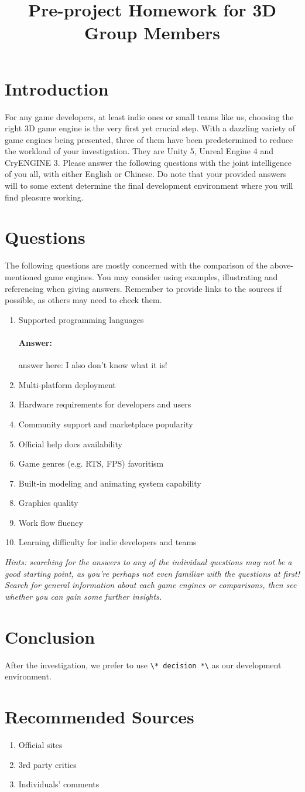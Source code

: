 \documentclass{ctexart}
\title{Pre-project Homework for 3D Group Members}
\begin{document}
	\maketitle
	\section{Introduction}
	For any game developers, at least indie ones or small teams like us, choosing the right 3D game engine is the very first yet crucial step. With a dazzling variety of game engines being presented, three of them have been predetermined to reduce the workload of your investigation. They are Unity 5, Unreal Engine 4 and CryENGINE 3. Please answer the following questions with the joint intelligence of you all, with either English or Chinese. Do note that your provided answers will to some extent determine the final development environment where you will find pleasure working.
	\section{Questions}
	The following questions are mostly concerned with the comparison of the above-mentioned game engines. You may consider using examples, illustrating and referencing when giving answers. Remember to provide links to the sources if possible, as others may need to check them.
	\begin{enumerate}
		\item Supported programming languages
		\paragraph{Answer:}
		answer here:
		I also don't know what it is!
		\item Multi-platform deployment
		\item Hardware requirements for developers and users
		\item Community support and marketplace popularity
		\item Official help docs availability
		\item Game genres (e.g. RTS, FPS) favoritism
		\item Built-in modeling and animating system capability
		\item Graphics quality
		\item Work flow fluency
		\item Learning difficulty for indie developers and teams
	\end{enumerate}
	\textit{Hints: searching for the answers to any of the individual questions may not be a good starting point, as you're perhaps not even familiar with the questions at first! Search for general information about each game engines or comparisons, then see whether you can gain some further insights.}
	\section{Conclusion}
	After the investigation, we prefer to use \verb|\* decision *\| as our development environment.
	\newpage\appendix
	\section{Recommended Sources}
	\begin{enumerate}
		\item Official sites
		\item 3rd party critics
		\item Individuals' comments
	\end{enumerate}
\end{document}
